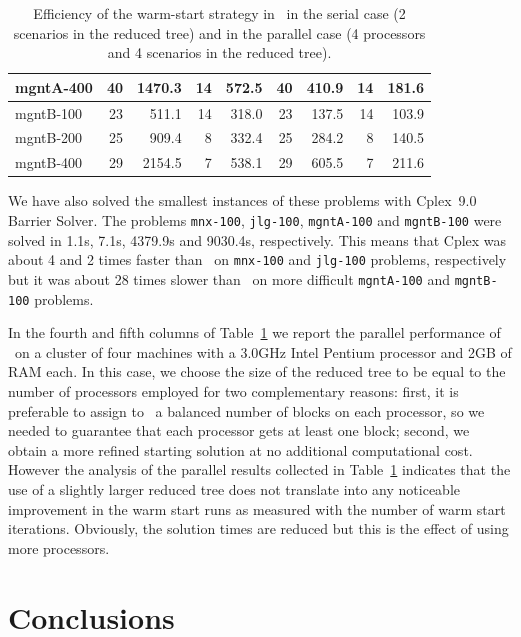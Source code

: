 \begin{table}[ht]
\begin{center}
\begin{tabular}{|l||rr|rr||rr|rr|}
mgntA-400     &   40 & 1470.3 &   14 &  572.5 &  40 &  410.9 &  14 &  181.6 \\
\hline
mgntB-100     &   23 &  511.1 &   14 &  318.0 &  23 &  137.5 &  14 &  103.9 \\
mgntB-200     &   25 &  909.4 &    8 &  332.4 &  25 &  284.2 &   8 &  140.5 \\
mgntB-400     &   29 & 2154.5 &    7 &  538.1 &  29 &  605.5 &   7 &  211.6 \\
\hline
    \end{tabular}
    \caption{Efficiency of the warm-start strategy in \OOPS\ in the serial
             case (2 scenarios in the reduced tree) and in the parallel case
	     (4 processors and 4 scenarios in the reduced tree).}
    \label{table:oops}
  \end{center} \vspace{-3ex}
\end{table}


We have also solved the smallest instances of these problems 
with Cplex~9.0 Barrier Solver. The problems 
{\tt mnx-100}, {\tt jlg-100}, {\tt mgntA-100} and {\tt mgntB-100} 
were solved in 1.1s, 7.1s, 4379.9s and 9030.4s, respectively.
This means that Cplex was about 4 and 2 times faster than \OOPS\
on {\tt mnx-100} and {\tt jlg-100} problems, respectively 
but it was about 28 times slower than \OOPS\ on more difficult
{\tt mgntA-100} and {\tt mgntB-100} problems.

In the fourth and fifth columns of Table~\ref{table:oops} 
we report the parallel performance 
of \OOPS\ on a cluster of four machines with a 3.0GHz Intel Pentium 
processor and 2GB of RAM each.
In this case, we choose the size of the reduced tree to be equal 
to the number of processors employed for two complementary reasons: 
first, it is preferable to assign to \OOPS\ a balanced number of blocks 
on each processor, so we needed to guarantee that each processor 
gets at least one block; second, we obtain a more refined 
starting solution at no additional computational cost. 
However the analysis of the parallel results collected 
in Table~\ref{table:oops}
indicates that the use of a slightly larger reduced tree does not 
translate into any noticeable improvement in the warm start runs 
as measured with the number of warm start iterations.
Obviously, the solution times are reduced but this is the effect 
of using more processors.


%
%
\section{Conclusions}
\label{sec:Conclusions}

